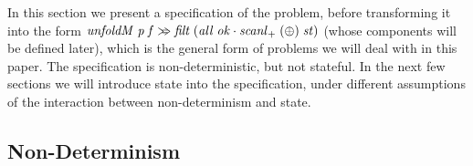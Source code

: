 \documentclass{llncs}
\newcommand{\Varid}[1]{\mathit{#1}}
\let\Varid\mathit
\begin{document}
In this section we present a specification of the problem, before transforming it into the form \ensuremath{\Varid{unfoldM}\;\Varid{p}\;\Varid{f}\mathrel{\hstretch{0.7}{>\!\!=\!\!\!>}}\Varid{filt}\;(\Varid{all}\;\Varid{ok}\mathbin{\cdot}\Varid{scanl}_{+}\;(\oplus)\;\Varid{st})} (whose components will be defined later), which is the general form of problems we will deal with in this paper.
The specification is non-deterministic, but not stateful.
In the next few sections we will introduce state into the specification,
under different assumptions of the interaction between non-determinism and state.

\subsection{Non-Determinism}
\end{document}
